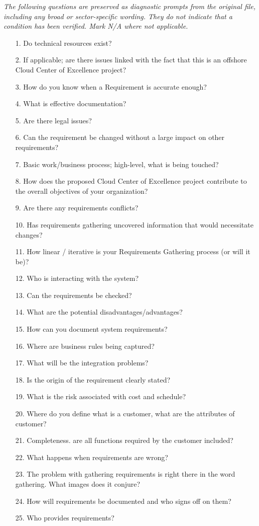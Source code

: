 \documentclass[10pt,letterpaper]{article}
\newcommand{\docsection}[1]{\par\Needspace{5\baselineskip}\vspace{8pt}{\large\sffamily\bfseries\color{navy}#1}\par\vspace{2pt}{\color{rulegrey}\rule{\linewidth}{.6pt}}\par}
\begin{document}
\docsection{03 \quad Source diagnostic checklist}
\textit{The following questions are preserved as diagnostic prompts from the original file, including any broad or sector-specific wording. They do not indicate that a condition has been verified. Mark N/A where not applicable.}
\begingroup\small\begin{enumerate}[leftmargin=2.1em, itemsep=4pt]
\item[1.] Do technical resources exist?
\item[2.] If applicable; are there issues linked with the fact that this is an offshore Cloud Center of Excellence project?
\item[3.] How do you know when a Requirement is accurate enough?
\item[4.] What is effective documentation?
\item[5.] Are there legal issues?
\item[6.] Can the requirement be changed without a large impact on other requirements?
\item[7.] Basic work/business process; high-level, what is being touched?
\item[8.] How does the proposed Cloud Center of Excellence project contribute to the overall objectives of your organization?
\item[9.] Are there any requirements conflicts?
\item[10.] Has requirements gathering uncovered information that would necessitate changes?
\item[11.] How linear / iterative is your Requirements Gathering process (or will it be)?
\item[12.] Who is interacting with the system?
\item[13.] Can the requirements be checked?
\item[14.] What are the potential disadvantages/advantages?
\item[15.] How can you document system requirements?
\item[16.] Where are business rules being captured?
\item[17.] What will be the integration problems?
\item[18.] Is the origin of the requirement clearly stated?
\item[19.] What is the risk associated with cost and schedule?
\item[20.] Where do you define what is a customer, what are the attributes of customer?
\item[21.] Completeness. are all functions required by the customer included?
\item[22.] What happens when requirements are wrong?
\item[23.] The problem with gathering requirements is right there in the word gathering. What images does it conjure?
\item[24.] How will requirements be documented and who signs off on them?
\item[25.] Who provides requirements?
\end{enumerate}\endgroup
\end{document}
